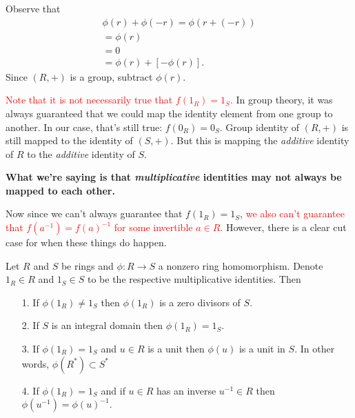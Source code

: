     \begin{prf}
        Observe that 
        \begin{align*}
            \phi(r) + \phi(-r) = \phi(r + (-r))\\
            = \phi(r)\\
            = 0\\
            = \phi(r) +[-\phi(r)].
        \end{align*}
        Since $(R, +)$ is a group, subtract $\phi(r)$.
    \end{prf}
    

    \textcolor{red}{Note that it is not necessarily true that
    $f(1_R) = 1_S$.} In group theory, it was always guaranteed
    that we could map the identity element from one group to
    another. In our case, that's still true: $f(0_R) = 0_S$. Group
    identity of $(R,+)$ is still mapped to the identity of $(S, +)$. But
    this is mapping the \textit{additive} identity of $R$ to the
    \textit{additive} identity of $S$. 
    
    \textbf{What we're saying is that
    \textit{multiplicative} identities may not always be mapped to each
    other. }
    
    Now since we can't always guarantee that
    $f(1_R) = 1_S$, \textcolor{red}{we also can't guarantee that $f(a^{-1}) =
    f(a)^{-1}$ for some invertible $a \in R$.}
    However, there is a clear cut case for when these things do
    happen.     
    \\

    \begin{proposition}
        Let $R$ and $S$ be rings and $\phi:R \to S$ a nonzero ring
        homomorphism. Denote $1_R \in R$ and $1_S \in S$ to be the
        respective multiplicative identities. Then 
        \begin{itemize}
            \item[1.] If $\phi(1_R) \ne 1_S$ then $\phi(1_R)$ is a
            zero divisors of $S$. 

            \item[2.] If $S$ is an integral domain then $\phi(1_R)
            = 1_S$. 
            
            \item[3.] If $\phi(1_R) = 1_S$ and $u \in R$ is a unit then
            $\phi(u)$ is a unit in $S$.
            In other words, $\phi(R^*) \subset S^*$

            \item[4.] If $\phi(1_R) = 1_S$ and if $u \in R$ has an
            inverse $u^{-1} \in R$ then $\phi(u^{-1}) = \phi(u)^{-1}$.
        \end{itemize}
    \end{proposition}

